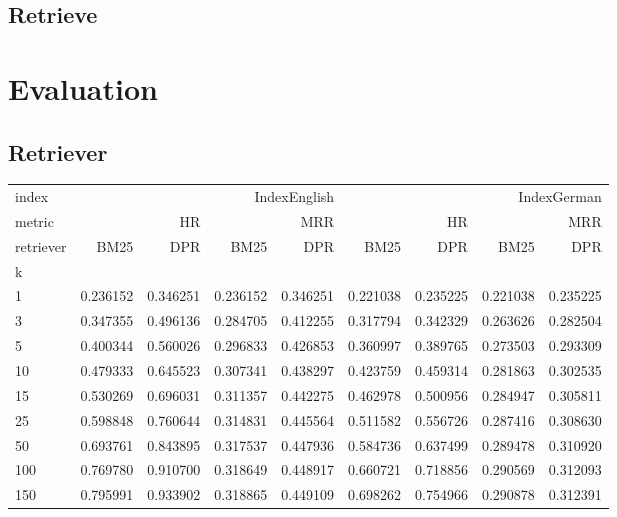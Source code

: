\subsection{Retrieve}

\section{Evaluation}
\label{ref:appendixA-evaluation}

\subsection{Retriever}
\label{ref:appendixA-evaluation-retriever}

\begin{table}
    \centering    
    \begin{tabular}{lrrrrrrrr}
    \toprule
    index & \multicolumn{4}{r}{IndexEnglish} & \multicolumn{4}{r}{IndexGerman} \\
    metric & \multicolumn{2}{r}{HR} & \multicolumn{2}{r}{MRR} & \multicolumn{2}{r}{HR} & \multicolumn{2}{r}{MRR} \\
    retriever & BM25 & DPR & BM25 & DPR & BM25 & DPR & BM25 & DPR \\
    k &  &  &  &  &  &  &  &  \\
    \midrule
    1 & 0.236152 & 0.346251 & 0.236152 & 0.346251 & 0.221038 & 0.235225 & 0.221038 & 0.235225 \\
    3 & 0.347355 & 0.496136 & 0.284705 & 0.412255 & 0.317794 & 0.342329 & 0.263626 & 0.282504 \\
    5 & 0.400344 & 0.560026 & 0.296833 & 0.426853 & 0.360997 & 0.389765 & 0.273503 & 0.293309 \\
    10 & 0.479333 & 0.645523 & 0.307341 & 0.438297 & 0.423759 & 0.459314 & 0.281863 & 0.302535 \\
    15 & 0.530269 & 0.696031 & 0.311357 & 0.442275 & 0.462978 & 0.500956 & 0.284947 & 0.305811 \\
    25 & 0.598848 & 0.760644 & 0.314831 & 0.445564 & 0.511582 & 0.556726 & 0.287416 & 0.308630 \\
    50 & 0.693761 & 0.843895 & 0.317537 & 0.447936 & 0.584736 & 0.637499 & 0.289478 & 0.310920 \\
    100 & 0.769780 & 0.910700 & 0.318649 & 0.448917 & 0.660721 & 0.718856 & 0.290569 & 0.312093 \\
    150 & 0.795991 & 0.933902 & 0.318865 & 0.449109 & 0.698262 & 0.754966 & 0.290878 & 0.312391 \\

\end{tabular}
\end{table}
